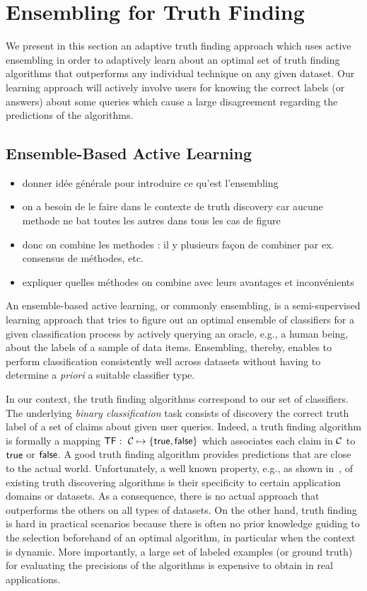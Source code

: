 \section{Ensembling for Truth Finding}\label{ensembling}
We present in this section an adaptive truth finding approach which uses active ensembling in order to 
adaptively learn about an optimal set of truth finding algorithms that outperforms any individual
technique on any given dataset. Our learning approach will actively involve users for knowing the correct
labels (or answers) about some queries which cause a large disagreement regarding the predictions of the algorithms.

\subsection{Ensemble-Based Active Learning}
\begin{itemize}
\item donner idée générale pour introduire  ce qu'est l'ensembling
\item on a besoin de le faire dans le contexte de truth discovery car aucune methode ne bat toutes les autres dans tous les cas de figure
\item donc on combine les methodes : il y plusieurs façon de combiner par ex. consensus de méthodes, etc.
\item expliquer quelles méthodes on combine avec leurs avantages et inconvénients
\end{itemize}

\medskip
An ensemble-based active learning, or commonly ensembling, is a semi-supervised learning approach that tries
to figure out an optimal ensemble of classifiers for a given classification process by actively querying an 
oracle, e.g., a human being, about the labels of a sample of data items. Ensembling, thereby, enables to perform
classification consistently well across datasets without having to determine a \emph{priori} a suitable classifier 
type.

In our context, the truth finding algorithms correspond to our set of classifiers. The underlying \emph{binary classification} 
task consists of discovery the correct truth label of a set of claims about given user queries. Indeed, a truth finding 
algorithm is formally a mapping $\textsf{TF}:~\mathcal{C} \mapsto \{\mathsf{true}, \mathsf{false}\}$ which associates each claim in $\mathcal{C}$
to $\mathsf{true}$ or $\mathsf{false}$. A good truth finding algorithm provides  predictions that are close to the actual world. Unfortunately, 
a well known property, e.g., as shown in~\cite{Li12, Wagui14}, of existing truth discovering algorithms is their specificity to 
certain application domains or datasets. As a consequence, there is no actual approach that outperforms the others on all types 
of datasets. On the other hand, truth finding is hard in practical scenarios because there is often no prior knowledge guiding to
the selection beforehand of an optimal algorithm, in particular when the context is dynamic. More importantly, a large set of labeled 
examples (or ground truth) for evaluating the precisions of the algorithms is expensive to obtain in real applications. 

